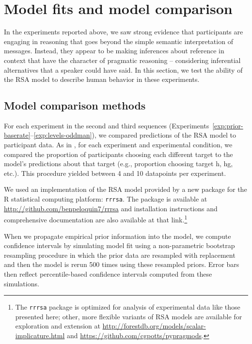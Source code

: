 \documentclass[man]{apa6}
\newcounter{Experiment}
\newcommand{\exptrefrange}[2]{Experiments~\ref{#1}--\ref{#2}}
\begin{document}
\section{Model fits and model comparison}
\label{sec:modelcomp}

In the experiments reported above, we saw strong evidence that participants are engaging in reasoning that goes beyond the simple semantic interpretation of messages. Instead, they appear to be making inferences about reference in context that have the character of pragmatic reasoning -- considering inferential alternatives that a speaker could have said. In this section, we test the ability of the RSA model to describe human behavior in these experiments.


\subsection{Model comparison methods}

For each experiment in the second and third sequences (\exptrefrange{exp:prior-baserate}{exp:levels-oddman}), we compared predictions of the RSA model to participant data. As in , for each experiment and experimental condition, we compared the proportion of participants choosing each different target to the model's predictions about that target (e.g., proportion choosing target {\sc h}, {\sc hg}, etc.). This procedure yielded between 4 and 10 datapoints per experiment.

We used an implementation of the RSA model provided by a new package for the R statistical computing platform: \texttt{rrrsa}. The package is available at \url{http://github.com/benpeloquin7/rrrsa} and installation instructions and comprehensive documentation are also available at that link.\footnote{The \texttt{rrrsa} package is optimized for analysis of experimental data like those presented here; other, more flexible variants of RSA models are available for exploration and extension at \url{http://forestdb.org/models/scalar-implicature.html} and \url{https://github.com/cgpotts/pypragmods}.}

When we propagate empirical prior information into the model, we compute confidence intervals by simulating model fit using a non-parametric bootstrap resampling procedure in which the prior data are resampled with replacement and then the model is rerun 500 times using these resampled priors. Error bars then reflect percentile-based confidence intervals computed from these simulations.
\end{document}
